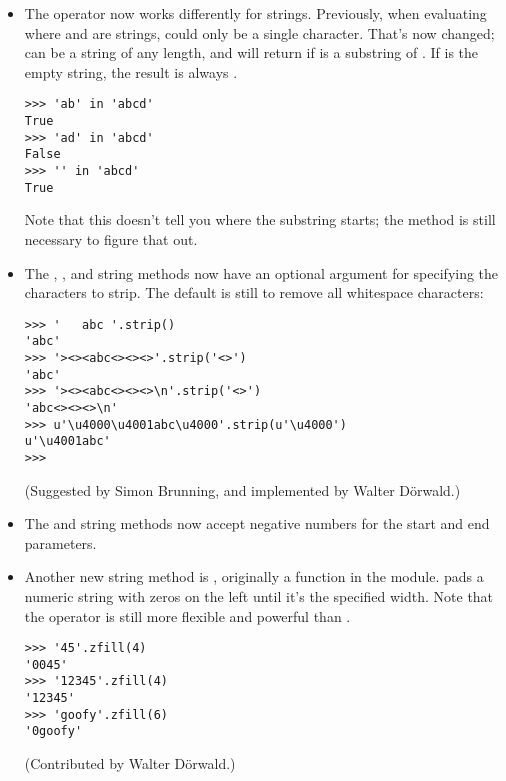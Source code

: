 \documentclass{howto}
\begin{document}
\begin{itemize}

\item The  operator now works differently for strings.
Previously, when evaluating  where 
and  are strings,  could only be a single character.
That's now changed;  can be a string of any length, and
 will return  if  is a
substring of .  If  is the empty string, the result is
always .

\begin{verbatim}
>>> 'ab' in 'abcd'
True
>>> 'ad' in 'abcd'
False
>>> '' in 'abcd'
True
\end{verbatim}

Note that this doesn't tell you where the substring starts; the
 method is still necessary to figure that out.

\item The , , and 
string methods now have an optional argument for specifying the
characters to strip.  The default is still to remove all whitespace
characters:

\begin{verbatim}
>>> '   abc '.strip()
'abc'
>>> '><><abc<><><>'.strip('<>')
'abc'
>>> '><><abc<><><>\n'.strip('<>')
'abc<><><>\n'
>>> u'\u4000\u4001abc\u4000'.strip(u'\u4000')
u'\u4001abc'
>>>
\end{verbatim}

(Suggested by Simon Brunning, and implemented by Walter D\"orwald.)

\item The  and 
string methods now accept negative numbers for the start and end
parameters.

\item Another new string method is , originally a
function in the  module.   pads a
numeric string with zeros on the left until it's the specified width.
Note that the \code{\%} operator is still more flexible and powerful
than .

\begin{verbatim}
>>> '45'.zfill(4)
'0045'
>>> '12345'.zfill(4)
'12345'
>>> 'goofy'.zfill(6)
'0goofy'
\end{verbatim}

(Contributed by Walter D\"orwald.)


\end{itemize}
\end{document}
